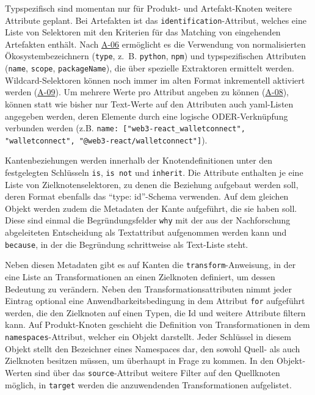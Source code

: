Typspezifisch sind momentan nur für Produkt- und Artefakt-Knoten weitere Attribute geplant.
Bei Artefakten ist das \texttt{identification}-Attribut, welches eine Liste von Selektoren mit den Kriterien für das Matching von eingehenden Artefakten enthält.
Nach \hyperref[subsec:req-type-specific-matching]{A-06} ermöglicht es die Verwendung von normalisierten Ökosystembezeichnern (\texttt{type}, z.\ B. \texttt{python}, \texttt{npm}) und typspezifischen Attributen (\texttt{name}, \texttt{scope}, \texttt{packageName}), die über spezielle Extraktoren ermittelt werden.
Wildcard-Selektoren können noch immer im alten Format inkrementell aktiviert werden (\hyperref[subsec:req-regex-support]{A-09}).
Um mehrere Werte pro Attribut angeben zu können (\hyperref[subsec:req-multiple-attribute-values]{A-08}), können statt wie bisher nur Text-Werte auf den Attributen auch \acrshort{yaml}-Listen angegeben werden, deren Elemente durch eine logische ODER-Verknüpfung verbunden werden (z.B. \texttt{name: ["web3-react\_walletconnect", "walletconnect", "@web3-react/walletconnect"]}).

Kantenbeziehungen werden innerhalb der Knotendefinitionen unter den festgelegten Schlüsseln \texttt{is}, \texttt{is not} und \texttt{inherit}.
Die Attribute enthalten je eine Liste von Zielknotenselektoren, zu denen die Beziehung aufgebaut werden soll, deren Format ebenfalls das \enquote{type: id}-Schema verwenden.
Auf dem gleichen Objekt werden zudem die Metadaten der Kante aufgeführt, die sie haben soll.
Diese sind einmal die Begründungsfelder \texttt{why} mit der aus der Nachforschung abgeleiteten Entscheidung als Textattribut aufgenommen werden kann und \texttt{because}, in der die Begründung schrittweise als Text-Liste steht.

Neben diesen Metadaten gibt es auf Kanten die \texttt{transform}-Anweisung, in der eine Liste an Transformationen an einen Zielknoten definiert, um dessen Bedeutung zu verändern.
Neben den Transformationsattributen nimmt jeder Eintrag optional eine Anwendbarkeitsbedingung in dem Attribut \texttt{for} aufgeführt werden, die den Zielknoten auf einen Typen, die Id und weitere Attribute filtern kann.
Auf Produkt-Knoten geschieht die Definition von Transformationen in dem \texttt{namespaces}-Attribut, welcher ein Objekt darstellt.
Jeder Schlüssel in diesem Objekt stellt den Bezeichner eines Namespaces dar, den sowohl Quell- als auch Zielknoten besitzen müssen, um überhaupt in Frage zu kommen.
In den Objekt-Werten sind über das \texttt{source}-Attribut weitere Filter auf den Quellknoten möglich, in \texttt{target} werden die anzuwendenden Transformationen aufgelistet.

